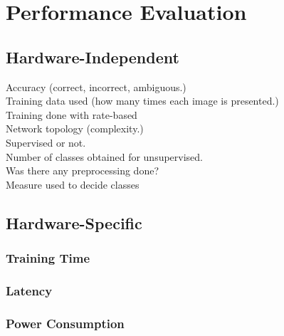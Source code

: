 \section{Performance Evaluation}
\label{sec:eval}
\subsection{Hardware-Independent}
Accuracy (correct, incorrect, ambiguous.) \\
Training data used (how many times each image is presented.)\\
Training done with rate-based\\
Network topology (complexity.)\\
Supervised or not.\\
Number of classes obtained for unsupervised.\\
Was there any preprocessing done?\\
Measure used to decide classes\\



\subsection{Hardware-Specific}
	\subsubsection{Training Time}
	\subsubsection{Latency}
	\subsubsection{Power Consumption}
	